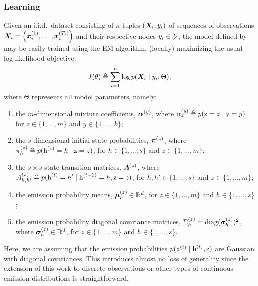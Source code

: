 \subsubsection{Learning}
\label{sec:spamhmm_learning}
Given an i.i.d.\ dataset consisting of $n$ tuples $({\bm{X}}_i, y_i)$ of sequences of observations ${\bm{X}}_i = \left({\bm{x}}_i^{(1)}, \dots,{\bm{x}}_i^{(T_i)} \right)$ and their respective nodes $y_i \in {\mathcal{Y}}$, the model defined by  may be easily trained using the EM algorithm, (locally) maximizing the usual log-likelihood objective:
\begin{equation}
    \label{eq:spamhmm_log_likelihood}
    J(\theta) \triangleq \sum_{i=1}^n \log p({\bm{X}}_i \mid y_i; \Theta),
\end{equation}
where $\Theta$ represents all model parameters, namely:
\begin{enumerate}
    \item the $m$-dimensional mixture coefficients, ${\bm{\alpha}}^{(y)}$, where $ {\alpha}^{(y)}_z \triangleq p({\textnormal{z}}=z \mid {\textnormal{y}}=y)$, for $z \in \{1,\dots,m\}$ and $y \in \{ 1,\dots,k \}$;
    \item the $s$-dimensional initial state probabilities, ${\bm{\pi}}^{(z)}$, where ${\pi}_h^{(z)} \triangleq p({\textnormal{h}}^{(1)}=h \mid {\textnormal{z}}=z)$, for $h \in \{1,\dots,s\}$ and $z \in \{1,\dots,m\}$;
    \item the $s \times s$ state transition matrices, ${\bm{A}}^{(z)}$, where ${A}^{(z)}_{h,h'} \triangleq p({\textnormal{h}}^{(t)}=h' \mid {\textnormal{h}}^{(t-1)}=h, {\textnormal{z}}=z)$, for $h,h' \in \{1,\dots,s\}$ and $z \in \{1,\dots,m\}$;
    \item the emission probability means, ${\bm{\mu}}^{(z)}_h \in \mathbb{R}^d$, for $z \in \{1,\dots,m\}$ and $h \in \{1,\dots,s\}$;
    \item the emission probability diagonal covariance matrices, $\Sigma^{(z)}_h = \mathrm{diag}({\bm{\sigma}}^{(z)}_h)^2$, where ${\bm{\sigma}}^{(z)}_h \in \mathbb{R}^d$, for $z \in \{1,\dots,m\}$ and $h \in \{1,\dots,s\}$.
\end{enumerate}

Here, we are assuming that the emission probabilities $p({\textnormal{x}}^{(t)}\mid{\textnormal{h}}^{(t)},{\textnormal{z}})$ are Gaussian with diagonal covariances. This introduces almost no loss of generality since the extension of this work to discrete observations or other types of continuous emission distributions is straightforward.

